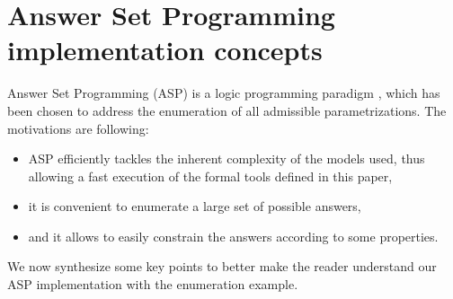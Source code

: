 \section{Answer Set Programming implementation concepts}\label{sec:impl}


\newcommand{\ti}[1]{\texttt{\textit{#1}}}
\newcommand{\aspil}[1]{\texttt{#1}}
\newcommand{\asp}[1]{\begin{itemize} \item[] \aspil{#1} \end{itemize}}

\newcommand{\atom}[1]{#1}
\newcommand{\predicate}[1]{#1}
\newcommand{\la}{\leftarrow}
\newcommand{\var}[1]{#1}
\newcommand{\nota}{\neg}

\newcommand{\paramlabel}{\predicate{param\_label}}
\newcommand{\paramres}{\predicate{param\_resource}}
\newcommand{\component}{\predicate{component}}
\newcommand{\componentlevels}{\predicate{component\_levels}}
\newcommand{\param}{\predicate{param}}
\newcommand{\inferedparam}{\predicate{infered\_param}}
\newcommand{\lessactive}{\predicate{less\_active}}
\newcommand{\paraminf}{\predicate{param\_inf}}



Answer Set Programming (ASP) is a logic programming paradigm \cite{Baral03},
which has been chosen to address the enumeration of all admissible parametrizations.
The motivations are following:
\begin{itemize}
  \item ASP efficiently tackles the inherent complexity of the models used, thus allowing a fast execution of the formal tools defined in this paper,
  \item it is convenient to enumerate a large set of possible answers,
  \item and it allows to easily constrain the answers according to some properties.
\end{itemize}
We now synthesize some key points to better make the reader understand our ASP implementation with the enumeration example.



